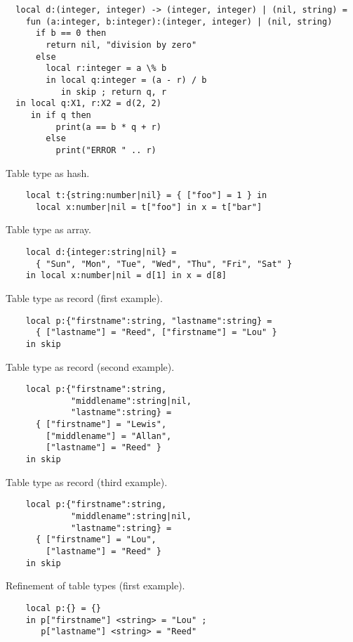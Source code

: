 \begin{verbatim}
  local d:(integer, integer) -> (integer, integer) | (nil, string) =
    fun (a:integer, b:integer):(integer, integer) | (nil, string)
      if b == 0 then
        return nil, "division by zero"
      else
        local r:integer = a \% b
        in local q:integer = (a - r) / b
           in skip ; return q, r
  in local q:X1, r:X2 = d(2, 2)
     in if q then
          print(a == b * q + r)
        else
          print("ERROR " .. r)
\end{verbatim}

Table type as hash.

\begin{verbatim}
    local t:{string:number|nil} = { ["foo"] = 1 } in
      local x:number|nil = t["foo"] in x = t["bar"]
\end{verbatim}

Table type as array.

\begin{verbatim}
    local d:{integer:string|nil} =
      { "Sun", "Mon", "Tue", "Wed", "Thu", "Fri", "Sat" }
    in local x:number|nil = d[1] in x = d[8]
\end{verbatim}

Table type as record (first example).

\begin{verbatim}
    local p:{"firstname":string, "lastname":string} =
      { ["lastname"] = "Reed", ["firstname"] = "Lou" }
    in skip
\end{verbatim}

Table type as record (second example).

\begin{verbatim}
    local p:{"firstname":string,
             "middlename":string|nil,
             "lastname":string} =
      { ["firstname"] = "Lewis",
        ["middlename"] = "Allan",
        ["lastname"] = "Reed" }
    in skip
\end{verbatim}

Table type as record (third example).

\begin{verbatim}
    local p:{"firstname":string,
             "middlename":string|nil,
             "lastname":string} =
      { ["firstname"] = "Lou",
        ["lastname"] = "Reed" }
    in skip
\end{verbatim}

Refinement of table types (first example).

\begin{verbatim}
    local p:{} = {}
    in p["firstname"] <string> = "Lou" ;
       p["lastname"] <string> = "Reed"
\end{verbatim}

